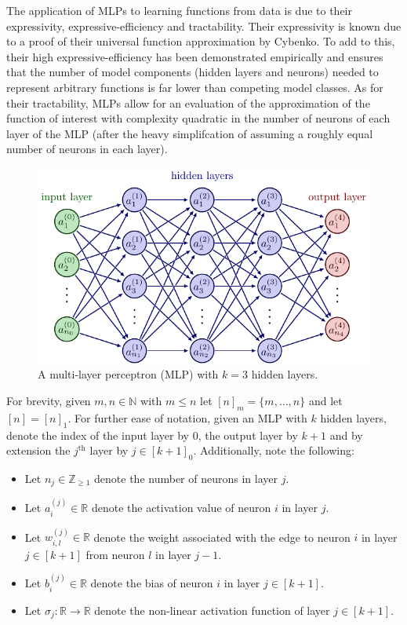 \documentclass[11pt]{article}
\begin{document}
The application of MLPs to learning functions from data is due to their expressivity, expressive-efficiency and tractability. Their expressivity is known due to a proof of their universal function approximation by Cybenko. To add to this, their high expressive-efficiency has been demonstrated empirically and ensures that the number of model components (hidden layers and neurons) needed to represent arbitrary functions is far lower than competing model classes. As for their tractability, MLPs allow for an evaluation of the approximation of the function of interest with complexity quadratic in the number of neurons of each layer of the MLP (after the heavy simplifcation of assuming a roughly equal number of neurons in each layer).

\begin{figure}[t]
    \centering
    \includegraphics[width=1\linewidth]{./figures/neural_nets/MLP_1.pdf}
    \caption{A multi-layer perceptron (MLP) with $k=3$ hidden layers.}
    \label{fig:MLP}
\end{figure}

For brevity, given $m,n\in\mathbb{N}$ with $m\leq n$ let $[n]_m=\{m,\dots,n\}$ and let $[n]=[n]_1$. For further ease of notation, given an MLP with $k$ hidden layers, denote the index of the input layer by $0$, the output layer by $k+1$ and by extension the $j^{\text{th}}$ layer by $j\in[k+1]_0$. Additionally, note the following:
\begin{itemize}
    \item Let $n_j\in\mathbb{Z}_{\geq1}$ denote the number of neurons in layer $j$.
    \item Let $a_i^{(j)}\in\mathbb{R}$ denote the activation value of neuron $i$ in layer $j$.
    \item Let $w_{i,l}^{(j)}\in\mathbb{R}$ denote the weight associated with the edge to neuron $i$ in layer $j\in[k+1]$ from neuron $l$ in layer $j-1$.
    \item Let $b_i^{(j)}\in\mathbb{R}$ denote the bias of neuron $i$ in layer $j\in[k+1]$.
    \item Let $\sigma_j:\mathbb{R}\rightarrow\mathbb{R}$ denote the non-linear activation function of layer $j\in[k+1]$.
\end{itemize}
\end{document}
